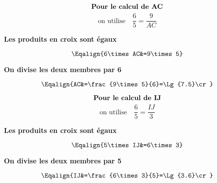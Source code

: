 \begin{methode*1}
            \begin{minipage}{8cm}
                $$\mbox{\bf Pour le calcul de AC}$$
                $$\mbox{on utilise} \quad \dfrac{6}{5}=\dfrac{9}{AC}$$
                \begin{center}
                    {\bf Les produits en croix sont égaux}
                \end{center}
                $$\Eqalign{6\times AC&=9\times5}$$
                \begin{center}
                    {\bf On divise les deux membres par 6}
                \end{center}
                $$\Eqalign{AC&=\frac{9\times5}{6}=\Lg{7.5}\cr}$$
            \end{minipage}
            \vrule
            \begin{minipage}{8cm}
                $$\mbox{\bf Pour le calcul de IJ}$$
                $$\mbox{on utilise} \quad \dfrac{6}{5}=\dfrac{IJ}{3}$$
                \begin{center}
                    {\bf Les produits en croix sont égaux}
                \end{center}
                $$\Eqalign{5\times IJ&=6\times3}$$
                \begin{center}
                    {\bf On divise les deux membres par 5}
                \end{center}
                $$\Eqalign{IJ&=\frac{6\times3}{5}=\Lg{3.6}\cr}$$
            \end{minipage}
        \end{methode*1}

